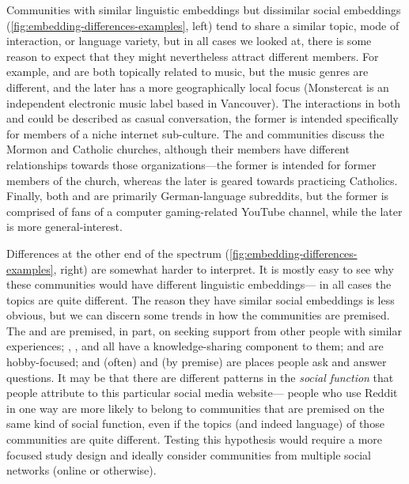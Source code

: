 \documentclass[11pt]{article}
\begin{document}
Communities with similar linguistic embeddings but dissimilar social embeddings
(\cref{fig:embedding-differences-examples}, left) tend to share a similar
topic, mode of interaction, or language variety, but 
in all cases we looked at, there is some reason to expect that
they might nevertheless attract different members.
For example,
 and  are both topically
related to music, but the music genres are different, and the later
has a more geographically local focus (Monstercat is an independent
electronic music label based in Vancouver). The interactions in both 
 and  
could be described as casual conversation, the former is intended specifically for
members of a niche internet sub-culture. %
The  and  communities discuss
the Mormon and Catholic churches, although their members have different 
relationships towards those organizations---the former is intended for
former members of the church, whereas the later is geared towards practicing
Catholics.
Finally, both  and  are primarily
German-language subreddits, but the former is comprised of fans of a
computer gaming-related YouTube channel, while the later is more
general-interest.

Differences at the other end of the spectrum
(\cref{fig:embedding-differences-examples}, right) are somewhat harder
to interpret.  It is mostly easy to see why these communities would
have different linguistic embeddings---%
in all cases the topics are quite different.  The reason they have
similar social embeddings is less obvious, but we can discern some
trends in how the communities are premised.  The
 and  are premised,
in part, on seeking support from other people with similar
experiences; , , and
 all have a knowledge-sharing component to them;
 and  are hobby-focused; and
 (often) and  (by premise) are
places people ask and answer questions.  It may be that there are
different patterns in the \emph{social function} that people attribute
to this particular social media website---%
people who use Reddit in one way are more likely to belong to
communities that are premised on the same kind of social function,
even if the topics (and indeed language) of those communities are
quite different.  Testing this hypothesis would require a more focused
study design and ideally consider communities from multiple social
networks (online or otherwise).
\end{document}
